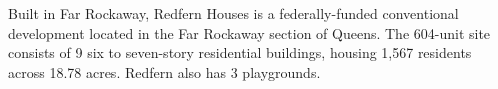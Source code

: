 Built in Far Rockaway, Redfern Houses is a federally-funded conventional development located in the Far Rockaway section of Queens. The 604-unit site consists of 9 six to seven-story residential buildings, housing 1,567 residents across 18.78 acres. Redfern also has 3 playgrounds.